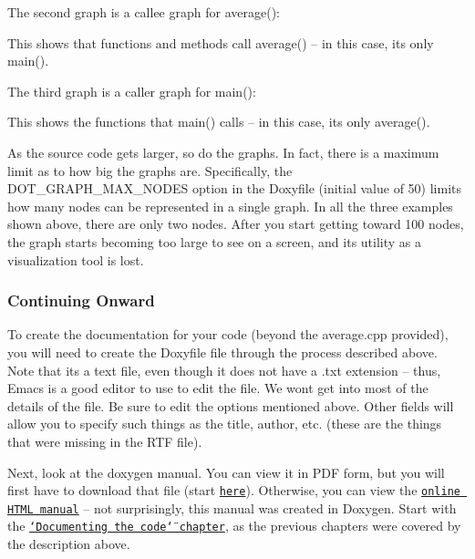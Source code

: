 The second graph is a callee graph for {\ttfamily average()}\+:



This shows that functions and methods call {\ttfamily average()} -- in this case, it\textquotesingle{}s only {\ttfamily main()}.

The third graph is a caller graph for {\ttfamily main()}\+:



This shows the functions that {\ttfamily main()} calls -- in this case, it\textquotesingle{}s only {\ttfamily average()}.

As the source code gets larger, so do the graphs. In fact, there is a maximum limit as to how big the graphs are. Specifically, the {\ttfamily D\+O\+T\+\_\+\+G\+R\+A\+P\+H\+\_\+\+M\+A\+X\+\_\+\+N\+O\+D\+ES} option in the Doxyfile (initial value of 50) limits how many nodes can be represented in a single graph. In all the three examples shown above, there are only two nodes. After you start getting toward 100 nodes, the graph starts becoming too large to see on a screen, and it\textquotesingle{}s utility as a visualization tool is lost.

\subsubsection*{Continuing Onward}

To create the documentation for your code (beyond the average.\+cpp provided), you will need to create the {\ttfamily Doxyfile} file through the process described above. Note that it\textquotesingle{}s a text file, even though it does not have a .txt extension -- thus, Emacs is a good editor to use to edit the file. We won\textquotesingle{}t get into most of the details of the file. Be sure to edit the options mentioned above. Other fields will allow you to specify such things as the title, author, etc. (these are the things that were missing in the R\+TF file).

Next, look at the doxygen manual. You can view it in P\+DF form, but you will first have to download that file (start \href{http://www.stack.nl/~dimitri/doxygen/download.html#dlmanual}{\tt here}). Otherwise, you can view the \href{http://www.stack.nl/~dimitri/doxygen/manual/index.html}{\tt online H\+T\+ML manual} -- not surprisingly, this manual was created in Doxygen. Start with the \href{http://www.stack.nl/~dimitri/doxygen/manual/docblocks.html}{\tt \char`\"{}\+Documenting the code\char`\"{} chapter}, as the previous chapters were covered by the description above.

